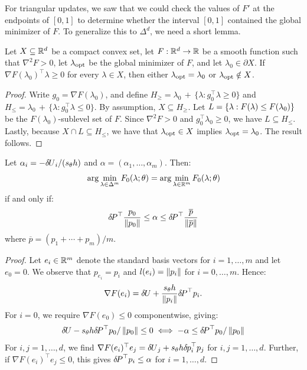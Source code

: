 \documentclass[eikonal.tex]{subfiles}
\begin{document}
For triangular updates, we saw that we could check the values of $F'$
at the endpoints of $[0, 1]$ to determine whether the interval
$[0, 1]$ contained the global minimizer of $F$. To generalize this to
$\Delta^d$, we need a short lemma.

\begin{lemma}
  Let $X \subseteq \mathbb{R}^d$ be a compact convex set, let
  $F : \mathbb{R}^d \to \mathbb{R}$ be a smooth function such that $\nabla^2 F > 0$,
  let $\lambda_{\operatorname{opt}}$ be the global minimizer of $F$, and let
  $\lambda_0 \in \partial X$. If
  $\nabla F(\lambda_0)^\top \lambda \geq 0$ for every $\lambda \in X$,
  then either $\lambda_{\operatorname{opt}} = \lambda_0$ or $\lambda_{\operatorname{opt}} \notin X$.
\end{lemma}

\begin{proof}
  Write $g_0 = \nabla F(\lambda_0)$, and define
  $H_{\geq} = \lambda_0 \,+\, \{\lambda: g_0^\top \lambda \geq 0\}$
  and
  $H_{\leq} = \lambda_0 \,+\, \{\lambda: g_0^\top \lambda \leq 0\}$.
  By assumption, $X \subseteq H_{\geq}$. Let
  $L = \left\{\lambda : F(\lambda) \leq F(\lambda_0)\right\}$ be the
  $F(\lambda_0)$-sublevel set of $F$. Since $\nabla^2 F > 0$ and
  $g_0^\top \lambda_0 \geq 0$, we have $L \subseteq H_{\leq}$. Lastly,
  because $X \cap L \subseteq H_{\leq}$, we have that
  $\lambda_{\operatorname{opt}} \in X$ implies $\lambda_{\operatorname{opt}} = \lambda_0$. The result
  follows.
\end{proof}

\begin{theorem}
  Let $\alpha_i = -{\delta \hspace{-0.09em} U}_i/(s_{\theta}h)$ and
  $\alpha = (\alpha_1, \hdots, \alpha_m)$. Then:
  \begin{align*}
    \arg\min_{\lambda \in \Delta^m} F_0(\lambda; \theta) = \arg\min_{\lambda \in \mathbb{R}^m} F_0(\lambda; \theta)
  \end{align*}
  if and only if:
  \begin{align*}
    {\delta \hspace{-0.14em} P}^\top \frac{p_0}{\left\|p_0\right\|} \leq \alpha \leq {\delta \hspace{-0.14em} P}^\top \frac{\overline{p}}{\left\|\overline{p}\right\|}
  \end{align*}
  where $\overline{p} = (p_1 + \cdots + p_m)/m$.
\end{theorem}

\begin{proof}
  Let $e_i \in \mathbb{R}^m$ denote the standard basis vectors for
  $i = 1, \hdots, m$ and let $e_0 = 0$. We observe that
  $p_{e_i} = p_i$ and $l(e_i) = \left\|p_i\right\|$ for $i = 0, \hdots,
  m$. Hence:
  \begin{align*}
    \nabla F(e_i) = {\delta \hspace{-0.09em} U} + \frac{s_\theta h}{\left\|p_i\right\|} {\delta \hspace{-0.14em} P}^\top p_i.
  \end{align*}
  For $i = 0$, we require $\nabla F(e_0) \leq 0$ componentwise, giving:
  \begin{align*}
    {\delta \hspace{-0.09em} U} - s_\theta h {\delta \hspace{-0.14em} P}^\top p_0/\left\|p_0\right\| \leq 0  \iff -\alpha \leq {\delta \hspace{-0.14em} P}^\top p_0/\left\|p_0\right\|
  \end{align*}
  For $i, j = 1, \hdots, d$, we find
  $\nabla F(e_i)^\top e_j = {\delta \hspace{-0.09em} U}_j + s_\theta h {\delta \hspace{-0.08em} p}_i^\top
  p_j$ for $i, j = 1, \hdots, d$. Further, if
  $\nabla F(e_i)^\top e_j \leq 0$, this gives
  ${\delta \hspace{-0.14em} P}^\top p_i \leq \alpha$ for $i = 1, \hdots, d$.
\end{proof}
\end{document}
